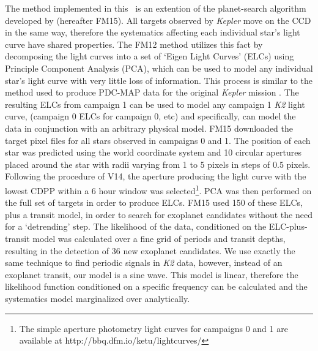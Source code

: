 \documentclass[useAMS, usenatbib, preprint, 12pt]{aastex}
\begin{document}
The method implemented in this \article\ is an extention of the planet-search
algorithm developed by \citet{Foreman-Mackey2015} (hereafter FM15).
All targets observed by {\it Kepler} move on the CCD in the same way,
therefore the systematics affecting each individual star's light curve have
shared properties.
The FM12 method utilizes this fact by decomposing the light curves into a set
of `Eigen Light Curves' (ELCs) using Principle Component Analysis (PCA), which
can be used to model any individual star's light curve with very little loss
of information.
This process is similar to the method used to produce PDC-MAP data for the
original {\it Kepler} mission \citep[][]{Stumpe2012, Smith2012}.
The resulting ELCs from campaign 1 can be used to model any campaign 1 {\it
K2} light curve, (campaign 0 ELCs for campaign 0, etc) and specifically, can
model the data in conjunction with an arbitrary physical model.
FM15 downloaded the target pixel files for all stars observed in campaigns 0
and 1.
The position of each star was predicted using the world coordinate system and
10 circular apertures placed around the star with radii varying from 1 to
5 pixels in steps of 0.5 pixels.
Following the procedure of V14, the aperture producing the
light curve with the lowest CDPP within a 6 hour window
\citep{Christiansen2012} was selected\footnote{The simple aperture photometry
light curves for campaigns 0 and 1 are available at
http://bbq.dfm.io/ketu/lightcurves/}.
PCA was then performed on the full set of targets in order to produce ELCs.
FM15 used 150 of these ELCs, plus a transit model, in order to
search for exoplanet candidates without the need for a `detrending' step.
The likelihood of the data, conditioned on the ELC-plus-transit
model was calculated over a fine grid of periods and transit depths, resulting
in the detection of 36 new exoplanet candidates.
We use exactly the same technique to find periodic signals in {\it K2} data,
however, instead of an exoplanet transit, our model is a sine wave.
This model is linear, therefore the likelihood function conditioned on
a specific frequency can be calculated and the systematics model marginalized
over analytically.
\end{document}
